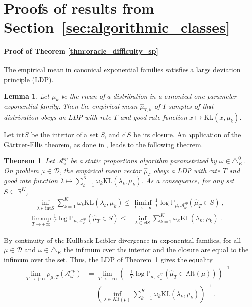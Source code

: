 \documentclass{article}
\newcommand{\KL}{\mathrm{KL}}
\newcommand{\alt}{\mathrm{Alt}}
\newtheorem{theorem}{Theorem}
\newtheorem{lemma}{Lemma}
\begin{document}



\appendix

\section{Proofs of results from Section~\ref{sec:algorithmic_classes}}
\label{sec:proofs_relative_to_section_sec:algorithmic_classes}

\paragraph{Proof of Theorem \ref{thm:oracle_difficulty_sp}}

The empirical mean in canonical exponential families satisfies a large deviation principle (LDP).

\begin{lemma}\label{lem:ldp_single_arm}
Let $\mu_k$ be the mean of a distribution in a canonical one-parameter exponential family. Then the empirical mean $\hat{\mu}_{T,k}$ of $T$ samples of that distribution obeys an LDP with rate $T$ and good rate function $x \mapsto \KL(x, \mu_k)$.
\end{lemma}

Let $\mathrm{int} S$ be the interior of a set $S$, and $\mathrm{cl} S$ be its closure.
An application of the Gärtner-Ellis theorem, as done in \cite{glynn2004large}, leads to the following theorem.
\begin{theorem}\label{thm:ldp}
Let $\mathcal A_\omega^{sp}$ be a static proportions algorithm parametrized by $\omega \in \triangle_K^0$. On problem $\mu \in \mathcal D$, the empirical mean vector $\hat{\mu}_T$ obeys a LDP with rate $T$ and good rate function $\lambda \mapsto \sum_{k=1}^K \omega_k \KL(\lambda_k, \mu_k)$. As a consequence, for any set $S \subseteq \mathbb{R}^K$,
\begin{align*}
- \inf_{\lambda \in \mathrm{int} S} \sum_{k=1}^K \omega_k \KL(\lambda_k, \mu_k)
\le \liminf_{T\to +\infty} \frac{1}{T} \log \mathbb{P}_{\mu, \mathcal A_\omega^{sp}}(\hat{\mu}_T \in S) \: ,
\\
\limsup_{T\to +\infty} \frac{1}{T} \log \mathbb{P}_{\mu, \mathcal A_\omega^{sp}}(\hat{\mu}_T \in S) 
\le - \inf_{\lambda \in \mathrm{cl} S} \sum_{k=1}^K \omega_k \KL(\lambda_k, \mu_k)
\: .
\end{align*}
\end{theorem}

By continuity of the Kullback-Leibler divergence in exponential families, for all $\mu \in \mathcal D$ and $\omega \in \triangle_K$ the infimum over the interior and the closure are equal to the infimum over the set.
Thus, the LDP of Theorem~\ref{thm:ldp} gives the equality 
\begin{align*}
\lim_{T \to +\infty}\rho_{\mu, T}(\mathcal A^{sp}_\omega)
&= \lim_{T \to +\infty}\left(- \frac{1}{T} \log \mathbb{P}_{\mu, \mathcal A_\omega^{sp}}(\hat{\mu}_T \in \alt(\mu)) \right)^{-1}
\\
&= \left(\inf_{\lambda \in \alt(\mu)} \sum_{k=1}^K \omega_k \KL(\lambda_k, \mu_k) \right)^{-1}
\: .
\end{align*}
\end{document}
